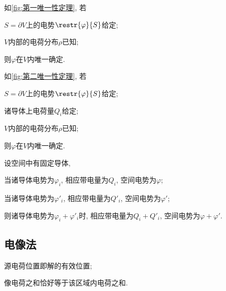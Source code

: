 \documentclass{ctexart}
\begin{document}
\begin{finale}
	\begin{theorem}[第一唯一性定理]
		如\cref{fig:第一唯一性定理}, 若
		\begin{cenum}
			\item $S = \partial V$上的电势$\restr{\varphi}{S}$给定;
			\item $V$内部的电荷分布$\rho$已知;
		\end{cenum}
		则$\varphi$在$V$内唯一确定.
	\end{theorem}
	\begin{theorem}[第二唯一性定理]
		如\cref{fig:第二唯一性定理}, 若
		\begin{cenum}
			\item $S = \partial V$上的电势$\restr{\varphi}{S}$给定;
			\item 诸导体上电荷量$Q_i$给定;
			\item $V$内部的电荷分布$\rho$已知;
		\end{cenum}
		则$\varphi$在$V$内唯一确定.
	\end{theorem}
	\begin{corollary}[导体静电场叠加原理] 
		设空间中有固定导体,
		\begin{cenum}
			\item 当诸导体电势为$\varphi_i$, 相应带电量为$Q_i$, 空间电势为$\varphi$;
			\item 当诸导体电势为$\varphi'_i$, 相应带电量为$Q'_i$, 空间电势为$\varphi'$;
		\end{cenum}
		则诸导体电势为$\varphi_i+\varphi'_i$时, 相应带电量为$Q_i+Q'_i$, 空间电势为$\varphi+\varphi'$.
	\end{corollary}
\end{finale}


\subsection{电像法} %
\label{sub:电像法}

\begin{finale}
	\begin{theorem}[电像法的原则]
		\quad
		\begin{cenum}
			\item 源电荷位置即解的有效位置;
			\item 像电荷之和恰好等于该区域内电荷之和.
		\end{cenum}
	\end{theorem}
\end{finale}
\end{document}
